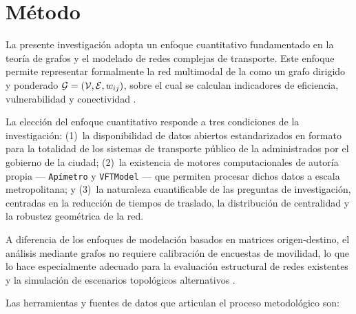
\section{Método}
\label{sec:metodo}

La presente investigación adopta un enfoque cuantitativo fundamentado
en la teoría de grafos y el modelado de redes complejas de transporte. Este
enfoque permite representar formalmente la red multimodal de la \zmvm{} como un
grafo dirigido y ponderado $\mathcal{G} = (\mathcal{V}, \mathcal{E}, w_{ij})$, sobre el
cual se calculan indicadores de eficiencia, vulnerabilidad y conectividad 
 \citep{allauca2023, owais2020}.

La elección del enfoque cuantitativo responde a tres condiciones 
de la
investigación: (1)~la disponibilidad de datos abiertos estandarizados en formato
\gtfs{} para la totalidad de los sistemas de transporte público de la \cdmx{} administrados
por el gobierno de la ciudad;
(2)~la existencia de motores computacionales de autoría propia ---
\texttt{Apímetro} \citep{cabrera2025apimetro} y \texttt{VFTModel}
\citep{cabrera2026VFTModel}--- que permiten procesar dichos datos a escala
metropolitana; y (3)~la naturaleza cuantificable de las preguntas de
investigación, centradas en la reducción de tiempos de traslado, la distribución
de centralidad y la robustez geométrica de la red.

A diferencia de los enfoques de modelación basados en matrices
origen-destino, el análisis mediante grafos no requiere calibración de encuestas
de movilidad, lo que lo hace especialmente adecuado para la evaluación
estructural de redes existentes y la simulación de escenarios topológicos
alternativos \citep{fortin2016innovative}.

Las herramientas y fuentes de datos que articulan el proceso metodológico son:

